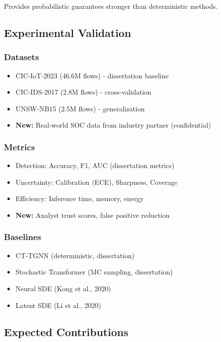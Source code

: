 \documentclass[11pt,letterpaper]{article}
\begin{document}
Provides probabilistic guarantees stronger than deterministic methods.

\subsection{Experimental Validation}

\subsubsection{Datasets}
\begin{itemize}
\item CIC-IoT-2023 (46.6M flows) - dissertation baseline
\item CIC-IDS-2017 (2.8M flows) - cross-validation
\item UNSW-NB15 (2.5M flows) - generalization
\item \textbf{New:} Real-world SOC data from industry partner (confidential)
\end{itemize}

\subsubsection{Metrics}
\begin{itemize}
\item Detection: Accuracy, F1, AUC (dissertation metrics)
\item Uncertainty: Calibration (ECE), Sharpness, Coverage
\item Efficiency: Inference time, memory, energy
\item \textbf{New:} Analyst trust scores, false positive reduction
\end{itemize}

\subsubsection{Baselines}
\begin{itemize}
\item CT-TGNN (deterministic, dissertation)
\item Stochastic Transformer (MC sampling, dissertation)
\item Neural SDE (Kong et al., 2020)
\item Latent SDE (Li et al., 2020)
\end{itemize}

\subsection{Expected Contributions}
\end{document}
